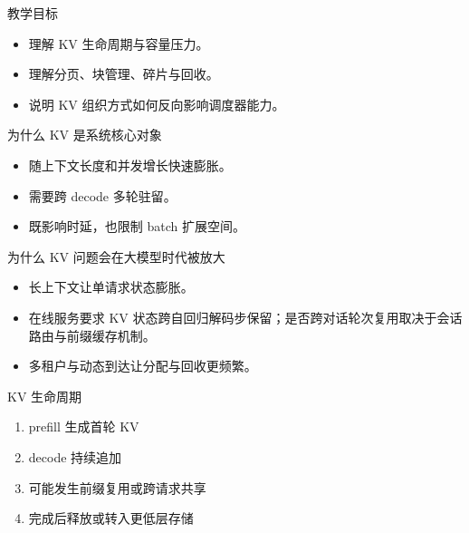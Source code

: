 




\begin{frame}[plain]
  \titlepage
\end{frame}

\begin{frame}{教学目标}
  \begin{itemize}
    \item 理解 KV 生命周期与容量压力。
    \item 理解分页、块管理、碎片与回收。
    \item 说明 KV 组织方式如何反向影响调度器能力。
  \end{itemize}
\end{frame}

\begin{frame}{为什么 KV 是系统核心对象}
  \begin{itemize}
    \item 随上下文长度和并发增长快速膨胀。
    \item 需要跨 decode 多轮驻留。
    \item 既影响时延，也限制 batch 扩展空间。
  \end{itemize}
\end{frame}

\begin{frame}{为什么 KV 问题会在大模型时代被放大}
  \begin{itemize}
    \item 长上下文让单请求状态膨胀。
    \item 在线服务要求 KV 状态跨自回归解码步保留；是否跨对话轮次复用取决于会话路由与前缀缓存机制。
    \item 多租户与动态到达让分配与回收更频繁。
  \end{itemize}
\end{frame}

\begin{frame}{KV 生命周期}
  \begin{enumerate}
    \item prefill 生成首轮 KV
    \item decode 持续追加
    \item 可能发生前缀复用或跨请求共享
    \item 完成后释放或转入更低层存储
  \end{enumerate}
\end{frame}

